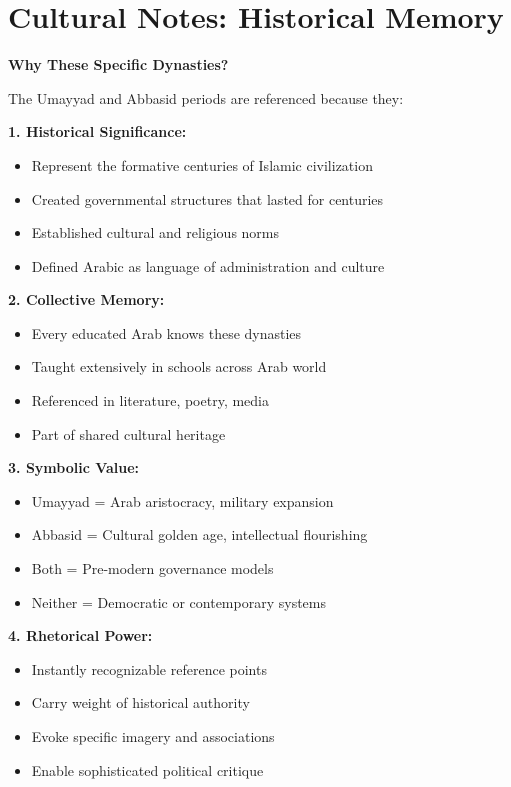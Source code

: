 \documentclass[letterpaper,12pt]{article}
\begin{document}
\section{Cultural Notes: Historical Memory}

\begin{tcolorbox}[colback=white,colframe=accentcolor,breakable]
\textbf{Why These Specific Dynasties?}

The Umayyad and Abbasid periods are referenced because they:

\textbf{1. Historical Significance:}
\begin{itemize}
\item Represent the formative centuries of Islamic civilization
\item Created governmental structures that lasted for centuries
\item Established cultural and religious norms
\item Defined Arabic as language of administration and culture
\end{itemize}

\textbf{2. Collective Memory:}
\begin{itemize}
\item Every educated Arab knows these dynasties
\item Taught extensively in schools across Arab world
\item Referenced in literature, poetry, media
\item Part of shared cultural heritage
\end{itemize}

\textbf{3. Symbolic Value:}
\begin{itemize}
\item Umayyad = Arab aristocracy, military expansion
\item Abbasid = Cultural golden age, intellectual flourishing
\item Both = Pre-modern governance models
\item Neither = Democratic or contemporary systems
\end{itemize}

\textbf{4. Rhetorical Power:}
\begin{itemize}
\item Instantly recognizable reference points
\item Carry weight of historical authority
\item Evoke specific imagery and associations
\item Enable sophisticated political critique
\end{itemize}


\end{tcolorbox}
\end{document}
